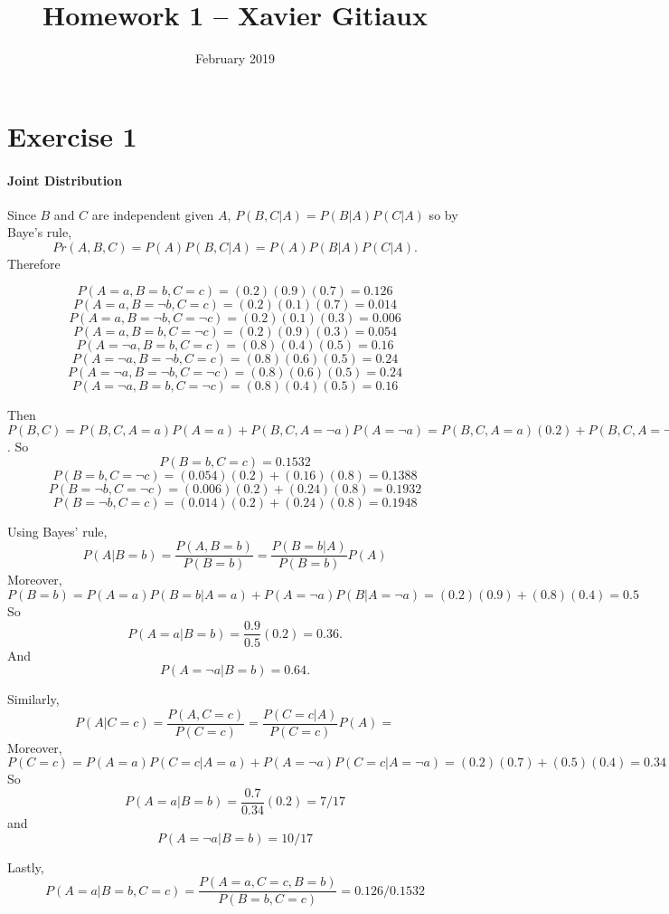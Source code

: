 \documentclass{article}
\title{Homework 1 -- Xavier Gitiaux}
\author{}
\date{February 2019}
\begin{document}
\maketitle

\section{Exercise 1}
\paragraph{Joint Distribution}
Since $B$ and $C$ are independent given $A$, $P(B, C|A)= P(B|A)P(C|A)$ so by Baye's rule,
\begin{equation}
\nonumber
Pr(A, B, C)= P(A)P(B, C|A) = P(A)P(B|A)P(C|A).
\end{equation}
Therefore 

$$P(A=a, B=b, C=c) = (0.2)(0.9)(0.7)= 0.126$$
$$P(A=a, B=\neg b, C=c) = (0.2)(0.1)(0.7)= 0.014
$$
$$P(A=a, B=\neg b, C=\neg c) = (0.2)(0.1)(0.3)=0.006$$
$$P(A=a, B= b, C=\neg c) = (0.2)(0.9)(0.3)=0.054$$
$$P(A=\neg a, B=b, C=c) = (0.8)(0.4)(0.5)=0.16$$
$$P(A=\neg a, B=\neg b, C=c) = (0.8)(0.6)(0.5)=0.24
$$
$$P(A=\neg a, B=\neg b, C=\neg c) = (0.8)(0.6)(0.5)=0.24$$
$$P(A=\neg a, B= b, C=\neg c) = (0.8)(0.4)(0.5)=0.16$$

Then $P(B, C)=P(B,C, A=a)P(A=a) + P(B, C, A=\neg a)P(A=\neg a)= P(B,C, A=a)(0.2) + P(B,C, A=\neg a)(0.8)$. 
So 
$$P(B=b, C=c)= 0.1532$$
$$P(B=b, C=\neg c)= (0.054)(0.2) + (0.16)(0.8) = 0.1388$$
$$P(B=\neg b, C=\neg c)= (0.006)(0.2) + (0.24)(0.8) = 0.1932$$
$$P(B=\neg b, C=c)= (0.014)(0.2) + (0.24)(0.8) = 0.1948
$$

\bigskip
Using Bayes' rule, 
\begin{equation}
\nonumber
P(A|B=b)=\frac{P(A,B=b)}{P(B=b)}=\frac{P(B=b|A)}{P(B=b)}P(A)
\end{equation}
Moreover, $P(B=b)= P(A=a)P(B=b|A=a) + P(A=\neg a)P(B|A=\neg a)=(0.2)(0.9) + (0.8)(0.4) = 0.5$
So $$P(A=a|B=b)=\frac{0.9}{0.5}(0.2)=0.36.$$
And $$P(A=\neg a|B=b)=0.64.$$

\bigskip
Similarly, 
\begin{equation}
\nonumber
P(A|C=c)=\frac{P(A,C=c)}{P(C=c)}=\frac{P(C=c|A)}{P(C=c)}P(A)=
\end{equation}
Moreover, $P(C=c)= P(A=a)P(C=c|A=a) + P(A=\neg a)P(C=c|A=\neg a)=(0.2)(0.7) + (0.5)(0.4) = 0.34$
So $$P(A=a|B=b)=\frac{0.7}{0.34}(0.2)=7/17$$ and 
$$P(A=\neg a|B=b)=10/17$$

\bigskip
Lastly, 
\begin{equation}
\nonumber
P(A=a|B=b, C=c)=\frac{P(A=a,C=c, B=b)}{P(B=b, C=c)}=0.126/0.1532
\end{equation}
\end{document}
